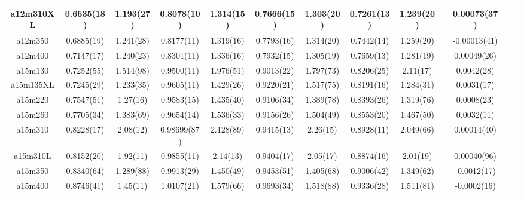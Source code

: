 \documentclass{article}
\begin{document}
\begin{table}[h!]
\begin{tabular}{|| c | c | c | c | c | c | c | c | c | c | c | c | c ||}
 \hline
 a12m310XL
  & 0.6635(18)   & 1.193(27)    & 0.8078(10)   & 1.314(15)    & 0.7666(15)   & 1.303(20)    & 0.7261(13)   & 1.239(20)    & {}           & 0.00073(37)  & {}           & {}          \\
 \hline
 a12m350
  & 0.6885(19)   & 1.241(28)    & 0.8177(11)   & 1.319(16)    & 0.7793(16)   & 1.314(20)    & 0.7442(14)   & 1.259(20)    & {}           & -0.00013(41) & {}           & {}          \\
 \hline
 a12m400
  & 0.7147(17)   & 1.240(23)    & 0.8301(11)   & 1.336(16)    & 0.7932(15)   & 1.305(19)    & 0.7659(13)   & 1.281(19)    & {}           & 0.00049(26)  & {}           & {}          \\
 \hline
 a15m130
  & 0.7252(55)   & 1.514(98)    & 0.9500(11)   & 1.976(51)    & 0.9013(22)   & 1.797(73)    & 0.8206(25)   & 2.11(17)     & {}           & 0.0042(28)   & {}           & {}          \\
 \hline
 a15m135XL
  & 0.7245(29)   & 1.233(35)    & 0.9605(11)   & 1.429(26)    & 0.9220(21)   & 1.517(75)    & 0.8191(16)   & 1.284(31)    & {}           & 0.0031(17)   & {}           & {}          \\
 \hline
 a15m220
  & 0.7547(51)   & 1.27(16)     & 0.9583(15)   & 1.435(40)    & 0.9106(34)   & 1.389(78)    & 0.8393(26)   & 1.319(76)    & {}           & 0.0008(23)   & {}           & {}          \\
 \hline
 a15m260
  & 0.7705(34)   & 1.383(69)    & 0.9654(14)   & 1.536(33)    & 0.9156(26)   & 1.504(49)    & 0.8553(20)   & 1.467(50)    & {}           & 0.0032(11)   & {}           & {}          \\
 \hline
 a15m310
  & 0.8228(17)   & 2.08(12)     & 0.98699(87)  & 2.128(89)    & 0.9415(13)   & 2.26(15)     & 0.8928(11)   & 2.049(66)    & {}           & 0.00014(40)  & {}           & {}          \\
 \hline
 a15m310L
  & 0.8152(20)   & 1.92(11)     & 0.9855(11)   & 2.14(13)     & 0.9404(17)   & 2.05(17)     & 0.8874(16)   & 2.01(19)     & {}           & 0.00040(96)  & {}           & {}          \\
 \hline
 a15m350
  & 0.8340(64)   & 1.289(88)    & 0.9913(29)   & 1.450(49)    & 0.9453(51)   & 1.405(68)    & 0.9006(42)   & 1.349(62)    & {}           & -0.0012(17)  & {}           & {}          \\
 \hline
 a15m400
  & 0.8746(41)   & 1.45(11)     & 1.0107(21)   & 1.579(66)    & 0.9693(34)   & 1.518(88)    & 0.9336(28)   & 1.511(81)    & {}           & -0.0002(16)  & {}           & {}          \\
 \hline
 \end{tabular}
\end{table}
\end{document}
